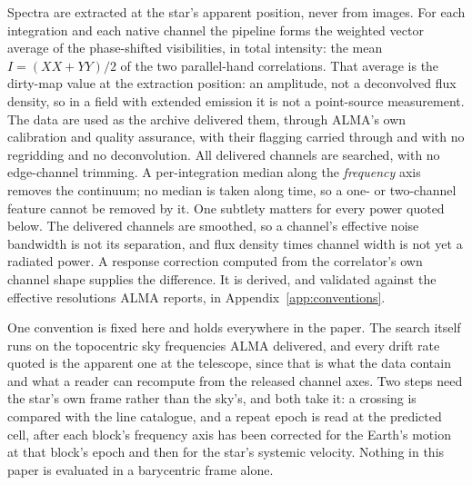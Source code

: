 Spectra are extracted at the star's apparent position, never from images.
For each integration and each native channel the pipeline forms the
weighted vector average of the phase-shifted visibilities, in total
intensity: the mean $I=(XX+YY)/2$ of the two parallel-hand
correlations. That average is the dirty-map value at the
extraction position: an amplitude, not a deconvolved flux density, so in
a field with extended emission it is not a point-source measurement. The data are used as the archive delivered them, through ALMA's own
calibration and quality assurance, with their flagging carried through
and with no regridding and no deconvolution. All delivered channels are searched,
with no edge-channel trimming. A per-integration median along the
\emph{frequency} axis removes the continuum; no median is taken along
time, so a one- or two-channel feature cannot be removed by it. One
subtlety matters for every power quoted below. The delivered channels are
smoothed, so a channel's effective noise bandwidth is not its separation,
and flux density times channel width is not yet a radiated power. A
response correction computed from the correlator's own channel shape
supplies the difference. It is derived, and validated against the
effective resolutions ALMA reports, in Appendix~\ref{app:conventions}.

One convention is fixed here and holds everywhere in the paper. The search
itself runs on the topocentric sky frequencies ALMA delivered, and every
drift rate quoted is the apparent one at the telescope, since that is what
the data contain and what a reader can recompute from the released channel
axes. Two steps need the star's own frame rather than the sky's, and both
take it: a crossing is compared with the line catalogue, and a repeat epoch
is read at the predicted cell, after each block's frequency axis has been
corrected for the Earth's motion at that block's epoch and then for the
star's systemic velocity. Nothing in this paper is evaluated in a
barycentric frame alone.

